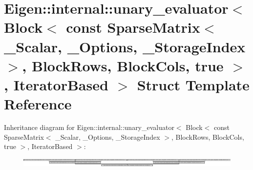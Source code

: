 \hypertarget{struct_eigen_1_1internal_1_1unary__evaluator_3_01_block_3_01const_01_sparse_matrix_3_01___scalarcdbc8f3eebef46901de7cc88abb0e702}{}\section{Eigen\+:\+:internal\+:\+:unary\+\_\+evaluator$<$ Block$<$ const Sparse\+Matrix$<$ \+\_\+\+Scalar, \+\_\+\+Options, \+\_\+\+Storage\+Index $>$, Block\+Rows, Block\+Cols, true $>$, Iterator\+Based $>$ Struct Template Reference}
\label{struct_eigen_1_1internal_1_1unary__evaluator_3_01_block_3_01const_01_sparse_matrix_3_01___scalarcdbc8f3eebef46901de7cc88abb0e702}
Inheritance diagram for Eigen\+:\+:internal\+:\+:unary\+\_\+evaluator$<$ Block$<$ const Sparse\+Matrix$<$ \+\_\+\+Scalar, \+\_\+\+Options, \+\_\+\+Storage\+Index $>$, Block\+Rows, Block\+Cols, true $>$, Iterator\+Based $>$\+:\begin{figure}[H]
\begin{center}
\leavevmode
\includegraphics[height=0.450161cm]{struct_eigen_1_1internal_1_1unary__evaluator_3_01_block_3_01const_01_sparse_matrix_3_01___scalarcdbc8f3eebef46901de7cc88abb0e702}
\end{center}
\end{figure}
